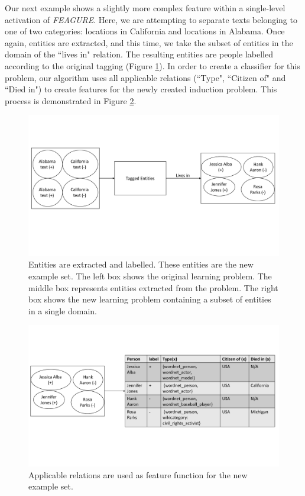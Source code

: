 \documentclass[twoside,11pt]{article}
\theoremstyle{definition}
\begin{document}
Our next example shows a slightly more complex feature within a single-level activation of \emph{FEAGURE}. Here, we are attempting to separate texts belonging to one of two categories: locations in California and locations in Alabama. 
Once again, entities are extracted, and this time, we take the subset of entities in the domain of the ``lives in" relation. The resulting entities are people labelled according to the original tagging (Figure \ref{fig:figure_rec2_example}).
In order to create a classifier for this problem, our algorithm uses all applicable relations (``Type", ``Citizen of" and ``Died in") to create features for the newly created induction problem. %
 This process is demonstrated in Figure \ref{fig:figure_rec2_problem}.

\begin{figure}[!h]
	\centering
	\includegraphics[width=\linewidth]{figure_rec2_example_new}
	\caption{Entities are extracted and labelled. These entities are the new example set. The left box shows the original learning problem. The middle box represents entities extracted from the problem. The right box shows the new learning problem containing a subset of entities in a single domain.}
	\label{fig:figure_rec2_example}
\end{figure}

\begin{figure}[!h]
	\centering
	\includegraphics[width=\linewidth]{figure_rec2_problem_new}
	\caption{Applicable relations are used as feature function for the new example set.}
	\label{fig:figure_rec2_problem}
\end{figure}
\end{document}
